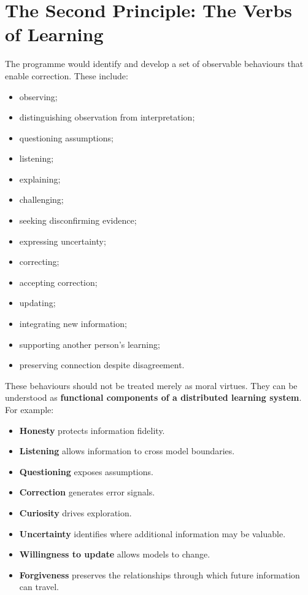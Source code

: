 \documentclass{article}
\begin{document}
\section{The Second Principle: The Verbs of Learning}
The programme would identify and develop a set of observable behaviours that enable correction. These include:
\begin{itemize}
    \item observing;
    \item distinguishing observation from interpretation;
    \item questioning assumptions;
    \item listening;
    \item explaining;
    \item challenging;
    \item seeking disconfirming evidence;
    \item expressing uncertainty;
    \item correcting;
    \item accepting correction;
    \item updating;
    \item integrating new information;
    \item supporting another person's learning;
    \item preserving connection despite disagreement.
\end{itemize}

These behaviours should not be treated merely as moral virtues. They can be understood as \textbf{functional components of a distributed learning system}. For example:
\begin{itemize}
    \item \textbf{Honesty} protects information fidelity.
    \item \textbf{Listening} allows information to cross model boundaries.
    \item \textbf{Questioning} exposes assumptions.
    \item \textbf{Correction} generates error signals.
    \item \textbf{Curiosity} drives exploration.
    \item \textbf{Uncertainty} identifies where additional information may be valuable.
    \item \textbf{Willingness to update} allows models to change.
    \item \textbf{Forgiveness} preserves the relationships through which future information can travel.
\end{itemize}
\end{document}

